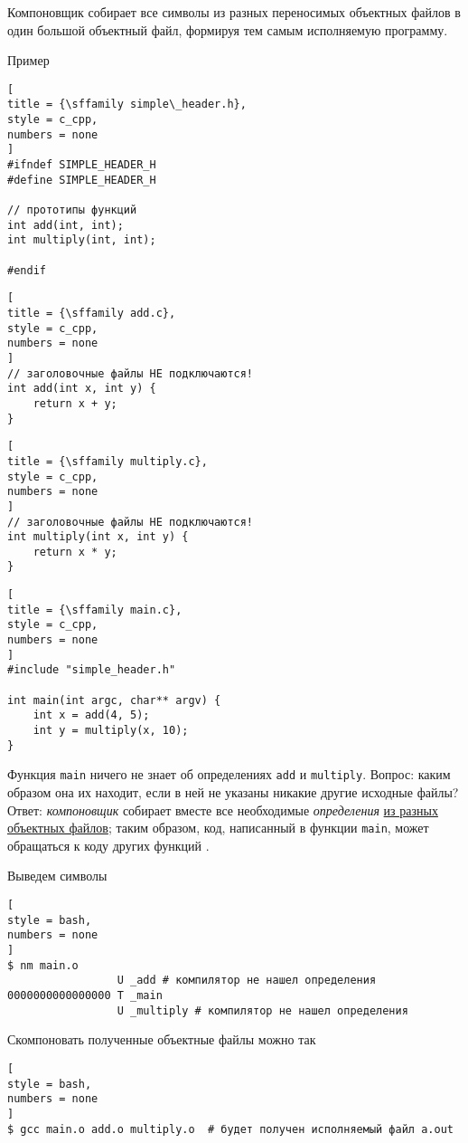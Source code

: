 \documentclass[%
	11pt,
	a4paper,
	utf8,
		]{article}
\begin{document}
Компоновщик собирает все символы из разных переносимых объектных файлов в один большой объектный файл, формируя тем самым исполняемую программу.

Пример
\begin{lstlisting}[
title = {\sffamily simple\_header.h},
style = c_cpp,
numbers = none
]
#ifndef SIMPLE_HEADER_H
#define SIMPLE_HEADER_H

// прототипы функций
int add(int, int);
int multiply(int, int);

#endif
\end{lstlisting}

\begin{lstlisting}[
title = {\sffamily add.c},
style = c_cpp,
numbers = none
]
// заголовочные файлы НЕ подключаются!
int add(int x, int y) {
    return x + y;
}
\end{lstlisting}

\begin{lstlisting}[
title = {\sffamily multiply.c},
style = c_cpp,
numbers = none
]
// заголовочные файлы НЕ подключаются!
int multiply(int x, int y) {
    return x * y;
}
\end{lstlisting}

\begin{lstlisting}[
title = {\sffamily main.c},
style = c_cpp,
numbers = none
]
#include "simple_header.h"

int main(int argc, char** argv) {
    int x = add(4, 5);
    int y = multiply(x, 10);
}
\end{lstlisting}

Функция \verb|main| ничего не знает об определениях \verb|add| и \verb|multiply|. Вопрос: каким образом она их находит, если в ней не указаны никакие другие исходные файлы? Ответ: \emph{компоновщик} собирает вместе все необходимые \emph{определения} \underline{из разных объектных файлов}; таким образом, код, написанный в функции \verb|main|, может обращаться к коду других функций \cite[]{amini-extreme-c:2022}.

Выведем символы
\begin{lstlisting}[
style = bash,
numbers = none
]
$ nm main.o
                 U _add # компилятор не нашел определения
0000000000000000 T _main
                 U _multiply # компилятор не нашел определения
\end{lstlisting}

Скомпоновать полученные объектные файлы можно так
\begin{lstlisting}[
style = bash,
numbers = none
]
$ gcc main.o add.o multiply.o  # будет получен исполняемый файл a.out
\end{lstlisting}
\end{document}
